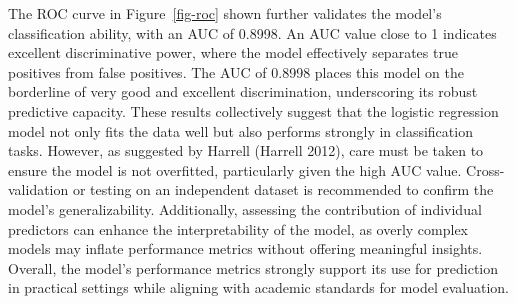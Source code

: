 \documentclass[
  letterpaper,
  DIV=11,
  numbers=noendperiod]{scrartcl}
\newenvironment{Shaded}{\begin{snugshade}}{\end{snugshade}}
\newcommand{\AttributeTok}[1]{\textcolor[rgb]{0.40,0.45,0.13}{#1}}
\newcommand{\CommentTok}[1]{\textcolor[rgb]{0.37,0.37,0.37}{#1}}
\newcommand{\ConstantTok}[1]{\textcolor[rgb]{0.56,0.35,0.01}{#1}}
\newcommand{\FloatTok}[1]{\textcolor[rgb]{0.68,0.00,0.00}{#1}}
\newcommand{\FunctionTok}[1]{\textcolor[rgb]{0.28,0.35,0.67}{#1}}
\newcommand{\NormalTok}[1]{\textcolor[rgb]{0.00,0.23,0.31}{#1}}
\newcommand{\OtherTok}[1]{\textcolor[rgb]{0.00,0.23,0.31}{#1}}
\newcommand{\SpecialCharTok}[1]{\textcolor[rgb]{0.37,0.37,0.37}{#1}}
\newcommand{\StringTok}[1]{\textcolor[rgb]{0.13,0.47,0.30}{#1}}
\begin{document}
The ROC curve in Figure~\ref{fig-roc} shown further validates the
model's classification ability, with an AUC of 0.8998. An AUC value
close to 1 indicates excellent discriminative power, where the model
effectively separates true positives from false positives. The AUC of
0.8998 places this model on the borderline of very good and excellent
discrimination, underscoring its robust predictive capacity. These
results collectively suggest that the logistic regression model not only
fits the data well but also performs strongly in classification tasks.
However, as suggested by Harrell (Harrell 2012), care must be taken to
ensure the model is not overfitted, particularly given the high AUC
value. Cross-validation or testing on an independent dataset is
recommended to confirm the model's generalizability. Additionally,
assessing the contribution of individual predictors can enhance the
interpretability of the model, as overly complex models may inflate
performance metrics without offering meaningful insights. Overall, the
model's performance metrics strongly support its use for prediction in
practical settings while aligning with academic standards for model
evaluation.

\begin{Shaded}
\end{Shaded}
\end{document}
